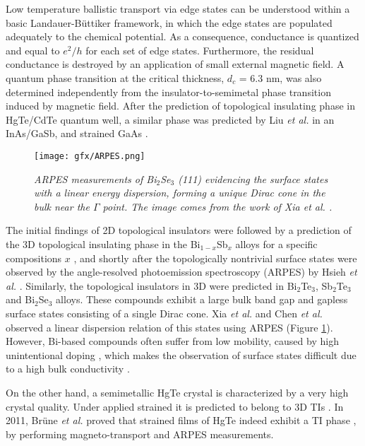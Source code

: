 \documentclass[titlepage,a4paper]{book}
\begin{document}
Low temperature ballistic transport via edge states can be understood within a basic Landauer-Büttiker \cite{Landauer_MCT} framework, in which the edge states are populated adequately to the chemical potential. As a consequence, conductance is quantized and equal to $e^2/h$ for each set of edge states. Furthermore, the residual conductance is destroyed by an application of small external magnetic field. A quantum phase transition at the critical thickness, $d_c$ = 6.3 nm, was also determined independently from the insulator-to-semimetal phase transition induced by magnetic field. After the prediction of topological insulating phase in HgTe/CdTe quantum well, a similar phase was predicted by Liu \textit{et al.} \cite{Liu_Topology} in an InAs/GaSb, and strained GaAs \cite{Bernevig_Topology1}. 

\begin{figure}[ht]
	\centering
	\texttt{[image: gfx/ARPES.png]}
	\vspace{-10pt}
	\caption{\textit{ARPES measurements of Bi$_2$Se$_3$ (111) evidencing the surface states with a linear energy dispersion, forming a unique Dirac cone in the bulk near the $\Gamma$ point. The image comes from the work of Xia \textit{et al.} \cite{Xia_Topology}.}}
	\label{fig:ARPES}
\end{figure}

The initial findings of 2D topological insulators were followed by a prediction of the 3D topological insulating phase in the Bi$_{1-x}$Sb$_x$ alloys for a specific compositions $x$ \cite{Fu_Topology}, and shortly after the topologically nontrivial surface states were observed by the angle-resolved photoemission spectroscopy (ARPES) by Hsieh \textit{et al.} \cite{Hsieh}. Similarly, the topological insulators in 3D were predicted in Bi$_2$Te$_3$, Sb$_2$Te$_3$ \cite{Zhang_Topology} and Bi$_2$Se$_3$ \cite{Zhang_Topology}\cite{Xia_Topology} alloys. These compounds exhibit a large bulk band gap and gapless surface states consisting of a single Dirac cone. Xia \textit{et al.} \cite{Xia_Topology} and Chen \textit{et al.} \cite{Chen_Topology} observed a linear dispersion relation of this states using ARPES (Figure \ref{fig:ARPES}). However, Bi-based compounds often suffer from low mobility, caused by high unintentional doping \cite{Brahlek_State}, which makes the observation of surface states difficult due to a high bulk conductivity \cite{Brune_State2}.

On the other hand, a semimetallic HgTe crystal is characterized by a very high crystal quality. Under applied strained it is predicted to belong to 3D TIs \cite{Kane_Fu}. In 2011, Brüne \textit{et al.} proved that strained films of HgTe indeed exhibit a TI phase \cite{Brune_State2}, by performing magneto-transport and ARPES measurements.
\end{document}
